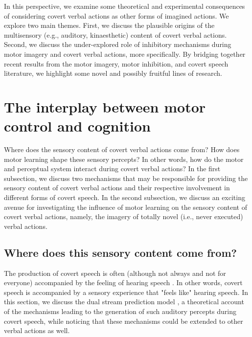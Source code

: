\documentclass[utf8]{template/frontiersSCNS} %
\begin{document}
In this perspective, we examine some theoretical and experimental consequences of considering covert verbal actions as other forms of imagined actions. We explore two main themes. First, we discuss the plausible origins of the multisensory (e.g., auditory, kinaesthetic) content of covert verbal actions. Second, we discuss the under-explored role of inhibitory mechanisms during motor imagery and covert verbal actions, more specifically. By bridging together recent results from the motor imagery, motor inhibition, and covert speech literature, we highlight some novel and possibly fruitful lines of research.

\section{The interplay between motor control and cognition}

Where does the sensory content of covert verbal actions come from? How does motor learning shape these sensory percepts? In other words, how do the motor and perceptual system interact during covert verbal actions? In the first subsection, we discuss two mechanisms that may be responsible for providing the sensory content of covert verbal actions and their respective involvement in different forms of covert speech. In the second subsection, we discuss an exciting avenue for investigating the influence of motor learning on the sensory content of covert verbal actions, namely, the imagery of totally novel (i.e., never executed) verbal actions.

\subsection{Where does this sensory content come from?}

The production of covert speech is often (although not always and not for everyone) accompanied by the feeling of hearing speech \cite{hurlburt_investigating_2011}. In other words, covert speech is accompanied by a sensory experience that "feels like" hearing speech. In this section, we discuss the dual stream prediction model \citep{tian_mental_2012, tian_effect_2013, tian_mental_2016}, a theoretical account of the mechanisms leading to the generation of such auditory percepts during covert speech, while noticing that these mechanisms could be extended to other verbal actions as well.
\end{document}
